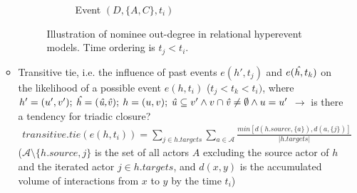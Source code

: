 \begin{itemize}
\begin{itemize}
\begin{figure}
\begin{mdframed}
\begin{subfigure}[t]{0.45\linewidth}
					\caption{Event $(D,\{A,C\},t_i)$}
				\end{subfigure}
				\caption{Illustration of nominee out-degree in relational hyperevent models. Time ordering is $t_j < t_i$.}
				\label{fig:rhem_nominee_outdegree}
			\end{mdframed}
		\end{figure}
	
		\item Transitive tie, i.e. the influence of past events $e(h',t_j)$ and $e(\text{\emph{\^h}},t_k)$ on the likelihood of a possible event $e(h,t_i)$ ($t_j < t_k < t_i)$, where $h' = (u',v'); \: \text{\emph{\^h}} = (\text{\emph{\^u,\^v}}); \: h = (u,v); \: \text{\emph{\^u}} \subseteq v' \land v \cap \text{\emph{\^v}} \neq \emptyset \land u = u'$ $\rightarrow$ is there a tendency for triadic closure?
		\begin{align*}
			transitive.tie(e(h,t_i)) = \sum_{j \in h.targets} \sum_{a \in \mathcal{A}} \frac{min[d(h.source,\{a\}),d(a,\{j\})]}{\lvert h.targets \rvert}
		\end{align*}
		($\mathcal{A} \setminus \{h.source,j\}$ is the set of all actors $A$ excluding the source actor of $h$ and the iterated actor $j \in h.targets$, and $d(x,y)$ is the accumulated volume of interactions from $x$ to $y$ by the time $t_i$)
		\begin{figure}
			\begin{mdframed}
				\centering
				\begin{subfigure}[t]{0.3\linewidth}
					\vskip 0pt
\end{subfigure}
\end{mdframed}
\end{figure}
\end{itemize}
\end{itemize}
